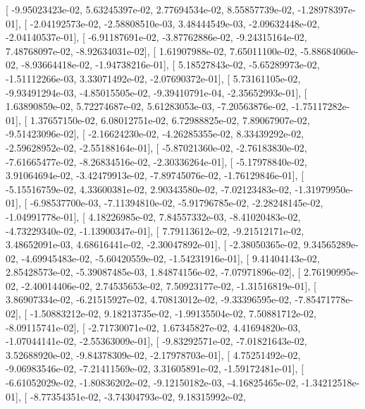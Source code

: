 \documentclass{article}
\begin{document}
       [ -9.95023423e-02,   5.63245397e-02,   2.77694534e-02,
          8.55857739e-02,  -1.28978397e-01],
       [ -2.04192573e-02,  -2.58808510e-03,   3.48444549e-03,
         -2.09632448e-02,  -2.04140537e-01],
       [ -6.91187691e-02,  -3.87762886e-02,  -9.24315164e-02,
          7.48768097e-02,  -8.92634031e-02],
       [  1.61907988e-02,   7.65011100e-02,  -5.88684060e-02,
         -8.93664418e-02,  -1.94738216e-01],
       [  5.18527843e-02,  -5.65289973e-02,  -1.51112266e-03,
          3.33071492e-02,  -2.07690372e-01],
       [  5.73161105e-02,  -9.93491294e-03,  -4.85015505e-02,
         -9.39410791e-04,  -2.35652993e-01],
       [  1.63890859e-02,   5.72274687e-02,   5.61283053e-03,
         -7.20563876e-02,  -1.75117282e-01],
       [  1.37657150e-02,   6.08012751e-02,   6.72988825e-02,
          7.89067907e-02,  -9.51423096e-02],
       [ -2.16624230e-02,  -4.26285355e-02,   8.33439292e-02,
         -2.59628952e-02,  -2.55188164e-01],
       [ -5.87021360e-02,  -2.76183830e-02,  -7.61665477e-02,
         -8.26834516e-02,  -2.30336264e-01],
       [ -5.17978840e-02,   3.91064694e-02,  -3.42479913e-02,
         -7.89745076e-02,  -1.76129846e-01],
       [ -5.15516759e-02,   4.33600381e-02,   2.90343580e-02,
         -7.02123483e-02,  -1.31979950e-01],
       [ -6.98537700e-03,  -7.11394810e-02,  -5.91796785e-02,
         -2.28248145e-02,  -1.04991778e-01],
       [  4.18226985e-02,   7.84557332e-03,  -8.41020483e-02,
         -4.73229340e-02,  -1.13900347e-01],
       [  7.79113612e-02,  -9.21512171e-02,   3.48652091e-03,
          4.68616441e-02,  -2.30047892e-01],
       [ -2.38050365e-02,   9.34565289e-02,  -4.69945483e-02,
         -5.60420559e-02,  -1.54231916e-01],
       [  9.41404143e-02,   2.85428573e-02,  -5.39087485e-03,
          1.84874156e-02,  -7.07971896e-02],
       [  2.76190995e-02,  -2.40014406e-02,   2.74535653e-02,
          7.50923177e-02,  -1.31516819e-01],
       [  3.86907334e-02,  -6.21515927e-02,   4.70813012e-02,
         -9.33396595e-02,  -7.85471778e-02],
       [ -1.50883212e-02,   9.18213735e-02,  -1.99135504e-02,
          7.50881712e-02,  -8.09115741e-02],
       [ -2.71730071e-02,   1.67345827e-02,   4.41694820e-03,
         -1.07044141e-02,  -2.55363009e-01],
       [ -9.83292571e-02,  -7.01821643e-02,   3.52688920e-02,
         -9.84378309e-02,  -2.17978703e-01],
       [  4.75251492e-02,  -9.06983546e-02,  -7.21411569e-02,
          3.31605891e-02,  -1.59172481e-01],
       [ -6.61052029e-02,  -1.80836202e-02,  -9.12150182e-03,
         -4.16825465e-02,  -1.34212518e-01],
       [ -8.77354351e-02,  -3.74304793e-02,   9.18315992e-02,
\end{document}
